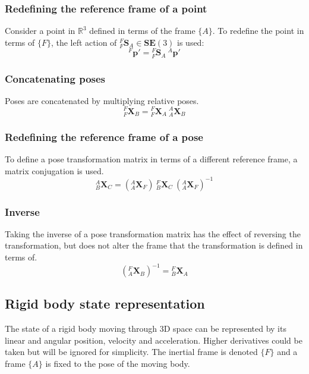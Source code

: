 		\subsubsection{Redefining the reference frame of a point}
		Consider a point in $\mathbb{R}^3$ defined in terms of the frame $\{A\}$. To redefine the point in terms of $\{F\}$, the left action of ${^{F}_{F}\mathbf{S}^{}_{A}} \in \mathbf{SE}(3)$ is used:
		\begin{equation}
			^{F}\mathbf{p'} = {^{F}_{F}\mathbf{S}^{}_{A}}\:^{A}\mathbf{p'}
		\end{equation}
		
		\subsubsection{Concatenating poses}
		Poses are concatenated by multiplying relative poses.
		\begin{equation}
			{^{F}_{F}\mathbf{X}^{}_{B}} = {^{F}_{F}\mathbf{X}^{}_{A}}\:{^{A}_{A}\mathbf{X}^{}_{B}}
		\end{equation}
		
		\subsubsection{Redefining the reference frame of a pose}
		To define a pose transformation matrix in terms of a different reference frame, a matrix conjugation is used.
		\begin{equation}
			{^{A}_{B}\mathbf{X}^{}_{C}} = ({^{A}_{A}\mathbf{X}^{}_{F}})\:{^{F}_{B}\mathbf{X}^{}_{C}}\:({^{A}_{A}\mathbf{X}^{}_{F}})^{-1}
		\end{equation}

		\subsubsection{Inverse}
		Taking the inverse of a pose transformation matrix has the effect of reversing the transformation, but does not alter the frame that the transformation is defined in terms of.
		\begin{equation}
			({^{F}_{A}\mathbf{X}^{}_{B}})^{-1} = {^{F}_{B}\mathbf{X}^{}_{A}}
		\end{equation}
	
	\subsection{Rigid body state representation} \label{state rep}
		The state of a rigid body moving through 3D space can be represented by its linear and angular position, velocity and acceleration. Higher derivatives could be taken but will be ignored for simplicity.
		The inertial frame is denoted $\{F\}$ and a frame $\{A\}$ is fixed to the pose of the moving body.
		
